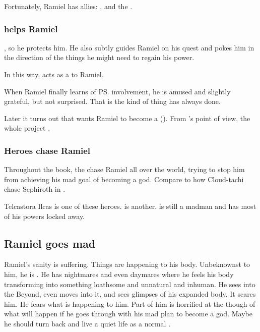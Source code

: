 Fortunately, Ramiel has allies: 
\Cishiel, \Azraid{} and the \vorcanths. 





\subsubsection{\Azraid{} helps Ramiel}
\Azraid{} , so he protects him. 
He also subtly guides Ramiel on his quest and pokes him in the direction of the things he might need to regain his power. 

In this way, \Azraid{} acts as a  to Ramiel. 

When Ramiel finally learns of \ps{\Azraid} involvement, he is amused and slightly grateful, but not surprised. 
That is the kind of thing \Azraid{} has always done. 

Later it turns out that \Azraid wants Ramiel to become a \neoresphan ().
From \Azraid's point of view, the whole \malach project . 





\subsubsection{Heroes chase Ramiel}
Throughout the book, the  chase Ramiel all over the world, trying to stop him from achieving his mad goal of becoming a god. 
Compare to how Cloud-tachi chase Sephiroth in \cite{VideoGame:FinalFantasyVII}. 

Telcastora Ilcas is one of these heroes.
\Sithiyacaan is another. 
\Sithiyacaan is still a madman and has most of his powers locked away. 









\subsection{Ramiel goes mad}
Ramiel's sanity is suffering.
Things are happening to his body.
Unbeknownst to him, he is . 
He has nightmares and even daymares where he feels his body transforming into something loathsome and unnatural and inhuman. 
He sees into the Beyond, even moves into it, and sees glimpses of his expanded \neoresphan body.
It scares him. 
He fears what is happening to him. 
Part of him is horrified at the though of what will happen if he goes through with his mad plan to become a god. 
Maybe he should turn back and live a quiet life as a normal \human. 


